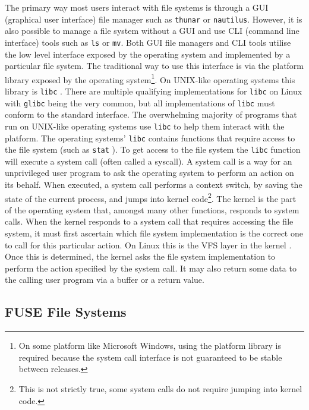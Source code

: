 The primary way most users interact with file systems is through a GUI
(graphical user interface) file manager such as \texttt{thunar} or
\texttt{nautilus}.
However, it is also possible to manage a file system without a GUI and use CLI
(command line interface) tools such as \texttt{ls} or \texttt{mv}. Both GUI
file managers and CLI tools utilise the low level interface exposed by the
operating system and implemented by a particular file system. The traditional
way to use this interface is via the platform library exposed by the operating
system\footnote{On some platform like Microsoft Windows, using the platform
library is required because the system call interface is not guaranteed to be
stable between releases.}. On UNIX-like operating systems this library is
\texttt{libc} \cite{libc}. There are multiple qualifying implementations for
\texttt{libc} on Linux with \texttt{glibc} being the very common, but all
implementations of \texttt{libc} must conform to the standard interface. The
overwhelming majority of programs that run on UNIX-like operating systems use
\texttt{libc} to help them interact with the platform. The operating systems'
\texttt{libc} contains functions that require access to the file system (such
as \texttt{stat} \cite{stat-syscall}). To get access to the file system the
\texttt{libc} function will execute a system call \cite{syscalls} (often called
a syscall). A system call is a way for an unprivileged user program to ask the
operating system to perform an action on its behalf. When executed, a system
call performs a context switch, by saving the state of the current process, and
jumps into kernel code\footnote{This is not strictly true, some system calls do
not require jumping into kernel code.}. The kernel is the part of the operating
system that, amongst many other functions, responds to system calls. When the
kernel responds to a system call that requires accessing the file system, it
must first ascertain which file system implementation is the correct one to
call for this particular action. On Linux this is the VFS layer in the kernel
\cite{kernel-vfs}. Once this is determined, the kernel asks the file system
implementation to perform the action specified by the system call. It may also
return some data to the calling user program via a buffer or a return value.

\subsection{FUSE File Systems}

